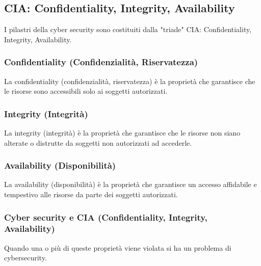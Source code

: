 \documentclass{beamer}
\begin{document}
\subsection{CIA: Confidentiality, Integrity, Availability}
\begin{frame}{\insertsubsection}
I pilastri della \alert{cyber security} sono costituiti dalla "triade" \alert{CIA}:
\alert{Confidentiality}, \alert{Integrity}, \alert{Availability}.
\end{frame}

\subsubsection*{Confidentiality (Confidenzialità, Riservatezza)}
\begin{frame}{\insertsubsection}{\insertsubsubsection}
\begin{block}{\insertsubsubsection}
La \alert{confidentiality} (confidenzialità, riservatezza) è la
proprietà che garantisce che le risorse sono accessibili solo ai
soggetti autorizzati.
\end{block}
\end{frame}

\subsubsection*{Integrity (Integrità)}
\begin{frame}{\insertsubsection}{\insertsubsubsection}
\begin{block}{\insertsubsubsection}
La \alert{integrity} (integrità) è la proprietà che garantisce che le
risorse non siano alterate o distrutte da soggetti non autorizzati ad
accederle.
\end{block}
\end{frame}

\subsubsection*{Availability (Disponibilità)}
\begin{frame}{\insertsubsection}{\insertsubsubsection}
\begin{block}{\insertsubsubsection}
La \alert{availability} (disponibilità) è la proprietà che garantisce un accesso
affidabile e tempestivo alle risorse da parte dei soggetti autorizzati.
\end{block}
\end{frame}

\subsubsection*{Cyber security e CIA (Confidentiality, Integrity, Availability)}
\begin{frame}{\insertsubsection}{\insertsubsubsection}
\begin{block}{\insertsubsubsection}
Quando una o più di queste proprietà viene violata si ha un problema di
\alert{cybersecurity}.
\end{block}
\end{frame}
\end{document}
